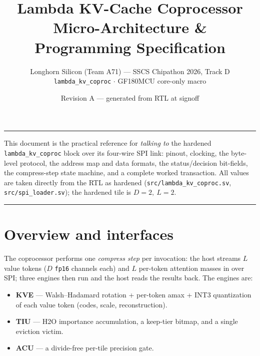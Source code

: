 \documentclass[11pt]{article}
\title{\vspace{-1.2cm}\textbf{Lambda KV-Cache Coprocessor}\\[2pt]
\large Micro-Architecture \& Programming Specification}
\author{Longhorn Silicon (Team A71) --- SSCS Chipathon 2026, Track D\\
\texttt{lambda\_kv\_coproc} $\cdot$ GF180MCU core-only macro}
\date{Revision A --- generated from RTL at signoff}
\newcommand{\reg}[1]{\texttt{#1}}
\begin{document}
\maketitle
\vspace{-0.6cm}
\hrule
\vspace{0.5cm}

This document is the practical reference for \emph{talking to} the hardened
\reg{lambda\_kv\_coproc} block over its four-wire SPI link: pinout, clocking, the
byte-level protocol, the address map and data formats, the status/decision
bit-fields, the compress-step state machine, and a complete worked transaction.
All values are taken directly from the RTL as hardened
(\reg{src/lambda\_kv\_coproc.sv}, \reg{src/spi\_loader.sv}); the hardened tile is
$D{=}2,\ L{=}2$.

\tableofcontents
\vspace{0.4cm}
\hrule

\section{Overview and interfaces}
The coprocessor performs one \emph{compress step} per invocation: the host
streams $L$ value tokens ($D$ \texttt{fp16} channels each) and $L$ per-token
attention masses in over SPI; three engines then run and the host reads the
results back. The engines are:
\begin{itemize}\setlength\itemsep{1pt}
\item \textbf{KVE} --- Walsh--Hadamard rotation + per-token amax + INT3
quantization of each value token (codes, scale, reconstruction).
\item \textbf{TIU} --- H2O importance accumulation, a keep-tier bitmap, and a
single eviction victim.
\item \textbf{ACU} --- a divide-free per-tile precision gate.
\end{itemize}
\end{document}
